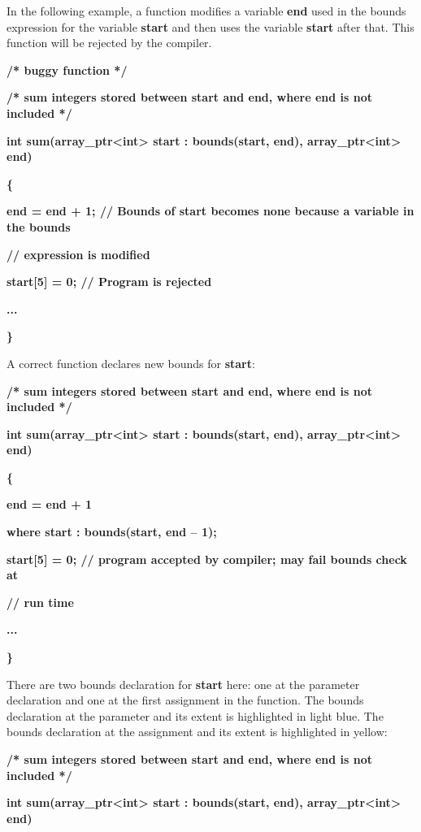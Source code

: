 \documentclass[]{article}
\begin{document}
In the following example, a function modifies a variable \textbf{end}
used in the bounds expression for the variable \textbf{start} and then
uses the variable \textbf{start} after that. This function will be
rejected by the compiler.

\textbf{/* buggy function */}

\textbf{/* sum integers stored between start and end, where end is not
included */}

\textbf{int sum(array\_ptr\textless{}int\textgreater{} start :
bounds(start, end), array\_ptr\textless{}int\textgreater{} end)}

\textbf{\{ }

\textbf{end = end + 1; // Bounds of start becomes none because a
variable in the bounds}

\textbf{// expression is modified}

\textbf{start{[}5{]} = 0; // Program is rejected}

\textbf{...}

\textbf{\}}

A correct function declares new bounds for \textbf{start}:

\textbf{/* sum integers stored between start and end, where end is not
included */}

\textbf{int sum(array\_ptr\textless{}int\textgreater{} start :
bounds(start, end), array\_ptr\textless{}int\textgreater{} end)}

\textbf{\{ }

\textbf{end = end + 1}

\textbf{where start : bounds(start, end -- 1);}

\textbf{start{[}5{]} = 0; // program accepted by compiler; may fail
bounds check at }

\textbf{// run time}

\textbf{...}

\textbf{\}}

There are two bounds declaration for \textbf{start} here: one at the
parameter declaration and one at the first assignment in the function.
The bounds declaration at the parameter and its extent is highlighted in
light blue. The bounds declaration at the assignment and its extent is
highlighted in yellow:

\textbf{/* sum integers stored between start and end, where end is not
included */}

\textbf{int sum(array\_ptr\textless{}int\textgreater{} start :
bounds(start, end), array\_ptr\textless{}int\textgreater{} end)}
\end{document}
